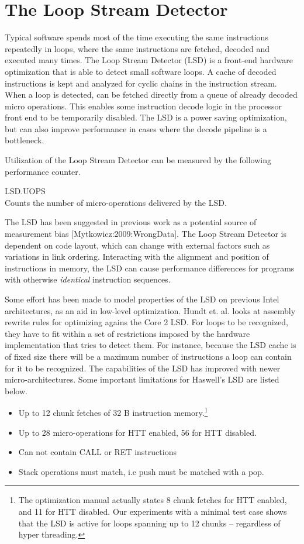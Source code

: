 \documentclass[a4paper,11pt,twocolumn,twoside]{article}
\begin{document}
\section{The Loop Stream Detector}
Typical software spends most of the time executing the same instructions repeatedly in loops, where the same instructions are fetched, decoded and executed many times. 
The Loop Stream Detector (LSD) is a front-end hardware optimization that is able to detect small software loops.
A cache of decoded instructions is kept and analyzed for cyclic chains in the instruction stream.
When a loop is detected, can be fetched directly from a queue of already decoded micro operations.
This enables some instruction decode logic in the processor front end to be temporarily disabled.
The LSD is a power saving optimization, but can also improve performance in cases where the decode pipeline is a bottleneck.

Utilization of the Loop Stream Detector can be measured by the following performance counter.
\begin{description}
  \item{LSD.UOPS} \hfill \\
  Counts the number of micro-operations delivered by the LSD.
\end{description}

The LSD has been suggested in previous work as a potential source of measurement bias [Mytkowicz:2009:WrongData].
The Loop Stream Detector is dependent on code layout, which can change with external factors such as variations in link ordering. 
Interacting with the alignment and position of instructions in memory, the LSD can cause performance differences for programs with otherwise \emph{identical} instruction sequences.

Some effort has been made to model properties of the LSD on previous Intel architectures, as an aid in low-level optimization. 
Hundt et. al. \cite{Hundt:2011:MAO} looks at assembly rewrite rules for optimizing agains the Core 2 LSD.
For loops to be recognized, they have to fit within a set of restrictions imposed by the hardware implementation that tries to detect them. 
For instance, because the LSD cache is of fixed size there will be a maximum number of instructions a loop can contain for it to be recognized.
The capabilities of the LSD has improved with newer micro-architectures.
Some important limitations for Haswell's LSD are listed below.
\begin{itemize}
  \item Up to 12 chunk fetches of 32 B instruction memory.\footnote{The optimization manual actually states 8 chunk fetches for HTT enabled, and 11 for HTT disabled. Our experiments with a minimal test case shows that the LSD is active for loops spanning up to 12 chunks -- regardless of hyper threading.}
  \item Up to 28 micro-operations for HTT enabled, 56 for HTT disabled.
  \item Can not contain CALL or RET instructions
  \item Stack operations must match, i.e push must be matched with a pop.
\end{itemize}
\end{document}
